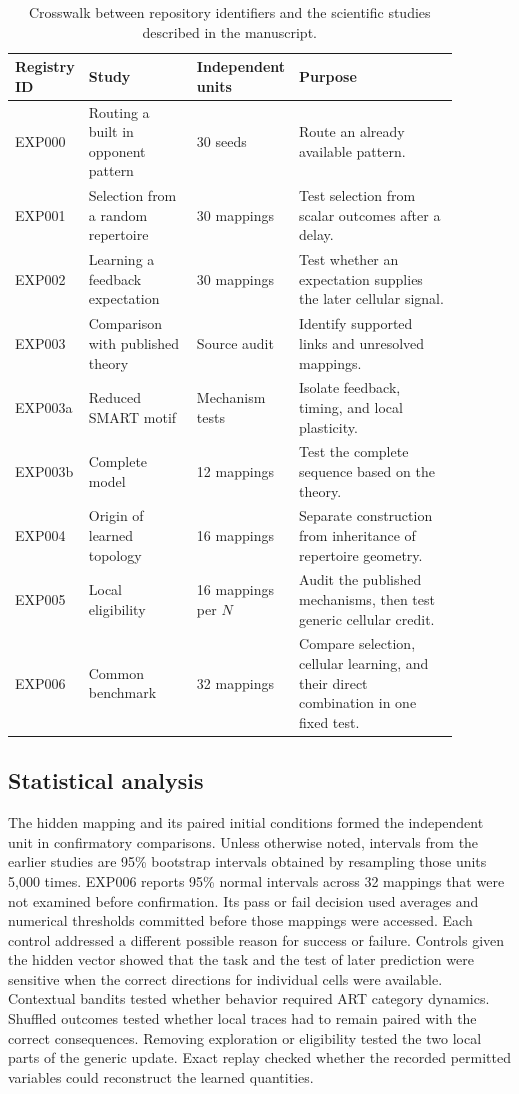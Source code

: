 \documentclass[11pt]{article}
\begin{document}
\begin{table}[tbp]
\centering\small
\begin{tabular}{L{0.11\linewidth}L{0.25\linewidth}L{0.14\linewidth}L{0.38\linewidth}}
\toprule
Registry ID & Study & Independent units & Purpose \\
\midrule
EXP000 & Routing a built in opponent pattern & 30 seeds & Route an already available pattern. \\
EXP001 & Selection from a random repertoire & 30 mappings & Test selection from scalar outcomes after a delay. \\
EXP002 & Learning a feedback expectation & 30 mappings & Test whether an expectation supplies the later cellular signal. \\
EXP003 & Comparison with published theory & Source audit & Identify supported links and unresolved mappings. \\
EXP003a & Reduced SMART motif & Mechanism tests & Isolate feedback, timing, and local plasticity. \\
EXP003b & Complete model & 12 mappings & Test the complete sequence based on the theory. \\
EXP004 & Origin of learned topology & 16 mappings & Separate construction from inheritance of repertoire geometry. \\
EXP005 & Local eligibility & 16 mappings per $N$ & Audit the published mechanisms, then test generic cellular credit. \\
EXP006 & Common benchmark & 32 mappings & Compare selection, cellular learning, and their direct combination in one fixed test. \\
\bottomrule
\end{tabular}
\caption{Crosswalk between repository identifiers and the scientific studies described in the manuscript.}
\label{tab:registry}
\end{table}

\subsection{Statistical analysis}
The hidden mapping and its paired initial conditions formed the independent unit in confirmatory comparisons. Unless otherwise noted, intervals from the earlier studies are 95\% bootstrap intervals obtained by resampling those units 5,000 times. EXP006 reports 95\% normal intervals across 32 mappings that were not examined before confirmation. Its pass or fail decision used averages and numerical thresholds committed before those mappings were accessed. Each control addressed a different possible reason for success or failure. Controls given the hidden vector showed that the task and the test of later prediction were sensitive when the correct directions for individual cells were available. Contextual bandits tested whether behavior required ART category dynamics. Shuffled outcomes tested whether local traces had to remain paired with the correct consequences. Removing exploration or eligibility tested the two local parts of the generic update. Exact replay checked whether the recorded permitted variables could reconstruct the learned quantities.
\end{document}
